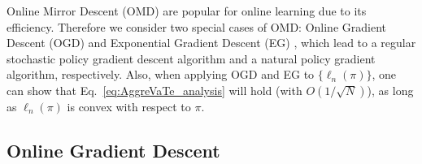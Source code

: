 \documentclass{article}
\newcommand{\todo}{\textcolor{red}{\textbf{[TODO]}}}
\begin{document}
Online Mirror Descent (OMD) \cite{shalev2012online} are popular for online learning due to its efficiency. Therefore we consider two special cases of  OMD: Online Gradient Descent (OGD) \cite{Zinkevich2003_ICML}  and Exponential Gradient Descent (EG) \cite{shalev2012online}, which lead to a regular stochastic policy gradient descent algorithm and a natural policy gradient algorithm, respectively. Also, when applying OGD and EG to $\{\ell_n(\pi)\}$, one can show that Eq.~\ref{eq:AggreVaTe_analysis} will hold (with $O(1/\sqrt{N})$), as long as $\ell_n(\pi)$ is convex with respect to $\pi$. 



\subsection{Online Gradient Descent}
\end{document}
